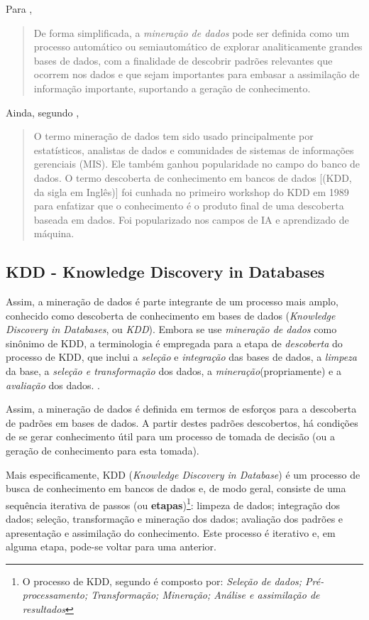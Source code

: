 Para \cite{Boscarioli2017},
\begin{quotation}
	De forma simplificada, a \textit{mineração de dados }pode ser definida como um processo automático ou semiautomático de explorar analiticamente grandes bases de dados, com a finalidade de descobrir padrões relevantes que ocorrem nos dados e que sejam importantes para embasar a assimilação de informação importante, suportando a geração de conhecimento. 
\end{quotation}

Ainda, segundo \cite{fayyad1996}, 
\begin{quotation}
	O termo mineração de dados tem sido usado principalmente por estatísticos, analistas de dados e comunidades de sistemas de informações gerenciais (MIS). Ele também ganhou popularidade no campo do banco de dados. O termo descoberta de conhecimento em bancos de dados [(KDD, da sigla em Inglês)] foi cunhada no primeiro workshop do KDD em 1989 para enfatizar que o conhecimento é o produto final de uma descoberta baseada em dados. Foi popularizado nos campos de IA e aprendizado de máquina.
\end{quotation}

\subsection{KDD - Knowledge Discovery in Databases}
Assim, a mineração de dados é parte integrante de um processo mais amplo, conhecido como descoberta de conhecimento em bases de dados (\textit{Knowledge Discovery in Databases}, ou \textit{KDD})\cite{fayyad1996}. Embora se use \textit{mineração de dados} como sinônimo de KDD, a terminologia é empregada para a etapa de \textit{descoberta}  do processo de KDD, que inclui a \textit{seleção} e \textit{integração} das bases de dados, a \textit{limpeza} da base, a \textit{seleção e transformação} dos dados, a \textit{mineração}(propriamente) e a \textit{avaliação} dos dados. \cite{ferrari2017}\cite{Boscarioli2017}.

Assim, a mineração de dados  é definida em termos de esforços para a descoberta de padrões em bases de dados. A partir destes padrões descobertos, há condições de se gerar conhecimento útil para um processo de tomada de decisão (ou a geração de conhecimento para esta tomada).

Mais especificamente, KDD (\textit{Knowledge Discovery in Database}) é um processo de busca de conhecimento em bancos de dados e, de modo geral, consiste de uma sequência iterativa de passos (ou \textbf{etapas})\footnote{O processo de KDD, segundo \cite{fayyad1996} é composto por: \textit{Seleção de dados; Pré-processamento; Transformação; Mineração; Análise e assimilação de resultados}}: limpeza de dados; integração dos dados; seleção, transformação e mineração dos dados; avaliação dos padrões e apresentação e assimilação do conhecimento. Este processo é iterativo e, em alguma etapa, pode-se voltar para uma anterior. \cite{Boscarioli2017}


